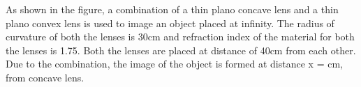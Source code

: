 \item As shown in the figure, a combination of a thin plano concave lens and a thin plano convex lens is used to image an object placed at infinity. The radius of curvature of both the lenses is 30cm and refraction index of the material for both the lenses is 1.75. Both the lenses are placed at distance of 40cm from each other. Due to the combination, the image of the object is formed at distance x = \underline{\hspace{2.5cm}} cm, from concave lens.
    \begin{center}
    \end{center}